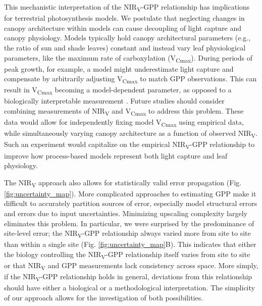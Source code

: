 \documentclass[10pt,letterpaper]{article}
\begin{document}
This mechanistic interpretation of the NIR\textsubscript{V}-GPP relationship has implications for terrestrial photosynthesis models.  We postulate that neglecting changes in canopy architecture within models can cause decoupling of light capture and canopy physiology. Models typically hold canopy architectural parameters (e.g., the ratio of sun and shade leaves) constant and instead vary leaf physiological parameters, like the maximum rate of carboxylation (V\textsubscript{Cmax}). During periods of peak growth, for example, a model might underestimate light capture and compensate by arbitrarily adjusting V\textsubscript{Cmax} to match GPP observations. This can result in V\textsubscript{Cmax} becoming a model-dependent parameter, as opposed to a biologically interpretable measurement \cite{Bonan2011}. Future studies should consider combining measurements of NIR\textsubscript{V} and V\textsubscript{Cmax} to address this problem. These data would allow for independently fixing model V\textsubscript{Cmax} using empirical data, while simultaneously varying canopy architecture as a function of observed NIR\textsubscript{V}. Such an experiment would capitalize on the empirical NIR\textsubscript{V}-GPP relationship to improve how process-based models represent both light capture and leaf physiology. 

The NIR\textsubscript{V} approach also allows for statistically valid error propagation (Fig. \ref{fig:uncertainty_map}). More complicated approaches to estimating GPP make it difficult to accurately partition sources of error, especially model structural errors and errors due to input uncertainties. Minimizing upscaling complexity largely eliminates this problem. In particular, we were surprised by the predominance of site-level error;  the NIR\textsubscript{V}-GPP relationship always varied more from site to site than within a single site (Fig. \ref{fig:uncertainty_map}B). This indicates that either the biology controlling the NIR\textsubscript{V}-GPP relationship itself  varies from site to site or that NIR\textsubscript{V} and GPP measurements lack consistency across space. More simply, if the NIR\textsubscript{V}-GPP relationship holds in general, deviations from this relationship should have either a biological or a methodological interpretation. The simplicity of our approach allows for the investigation of both possibilities. 
\end{document}
